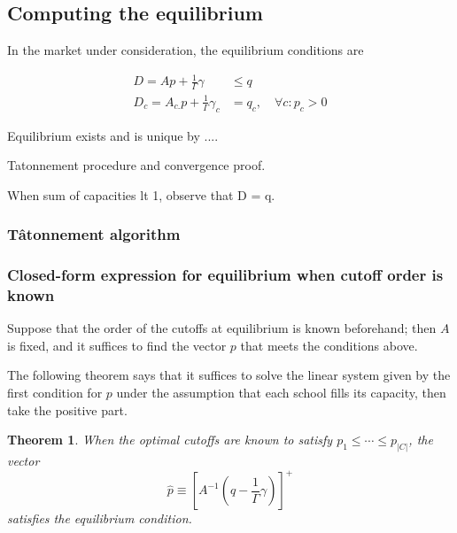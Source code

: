 \documentclass[12pt]{article}
\newtheorem{theorem}{Theorem}
\theoremstyle{definition}
\begin{document}
\subsection{Computing the equilibrium}
In the market under consideration, the equilibrium conditions are

\begin{align} D = A p + \frac{1}{\Gamma}\gamma &\leq q \\
D_c = A_{c.} p + \frac{1}{\Gamma} \gamma_c &= q_c, \quad \forall c: p_c > 0\end{align}

Equilibrium exists and is unique by ....

Tatonnement procedure and convergence proof.

When sum of capacities lt 1, observe that D = q.

\subsubsection{T\^{a}tonnement algorithm}

\subsubsection{Closed-form expression for equilibrium when cutoff order is known}

Suppose that the order of the cutoffs at equilibrium is known beforehand; then $A$ is fixed, and it suffices to find the vector $p$ that meets the conditions above. 

The following theorem says that it suffices to solve the linear system given by the first condition for $p$ under the assumption that each school fills its capacity, then take the positive part.

\begin{theorem}When the optimal cutoffs are known to satisfy $p_1 \leq \cdots \leq p_{|C|}$, the vector
\[\hat p \equiv \left[A^{-1} (q - \frac{1}{\Gamma} \gamma) \right]^+\]
satisfies the equilibrium condition.\end{theorem}
\end{document}
